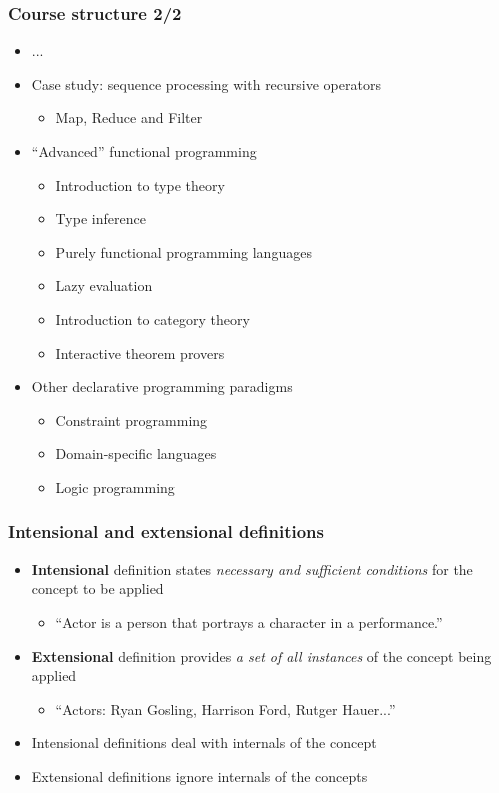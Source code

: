 \documentclass{beamer}
\begin{document}
\begin{frame}
  \frametitle{Course structure 2/2}
  \begin{itemize}
  \item[] ...
  \item Case study: sequence processing with recursive operators
    \begin{itemize}
    \item Map, Reduce and Filter
    \end{itemize}
  \item ``Advanced'' functional programming
    \begin{itemize}
    \item Introduction to type theory
    \item Type inference
    \item Purely functional programming languages
    \item Lazy evaluation
    \item Introduction to category theory
    \item Interactive theorem provers
    \end{itemize}
  \item Other declarative programming paradigms
    \begin{itemize}
    \item Constraint programming
    \item Domain-specific languages
    \item Logic programming
    \end{itemize}
  \end{itemize}
\end{frame}

\begin{frame}
  \frametitle{Intensional and extensional definitions}
  \begin{itemize}
  \item \textbf{Intensional} definition states \textit{necessary and sufficient
      conditions} for the concept to be applied
    \begin{itemize}
    \item ``Actor is a person that portrays a character in a performance.''
    \end{itemize}
  \item \textbf{Extensional} definition provides \textit{a set of all instances}
    of the concept being applied
    \begin{itemize}
    \item ``Actors: Ryan Gosling, Harrison Ford, Rutger Hauer...''
    \end{itemize}
  \item Intensional definitions deal with internals of the concept
  \item Extensional definitions ignore internals of the concepts
  \end{itemize}
\end{frame}
\end{document}
